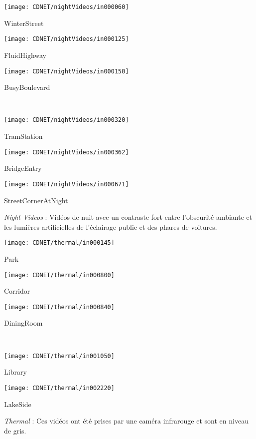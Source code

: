 	\begin{figureth}
		\begin{subfigureth}{0.24\textwidth}
			\texttt{[image: CDNET/nightVideos/in000060]}\caption{WinterStreet}	
		\end{subfigureth}
		\begin{subfigureth}{0.24\textwidth}
			\texttt{[image: CDNET/nightVideos/in000125]}\caption{FluidHighway}	
		\end{subfigureth}
		\begin{subfigureth}{0.24\textwidth}
			\texttt{[image: CDNET/nightVideos/in000150]}\caption{BusyBoulevard}	
		\end{subfigureth}\\
		\begin{subfigureth}{0.24\textwidth}
			\texttt{[image: CDNET/nightVideos/in000320]}\caption{TramStation}	
		\end{subfigureth}
		\begin{subfigureth}{0.24\textwidth}
			\texttt{[image: CDNET/nightVideos/in000362]}\caption{BridgeEntry}	
		\end{subfigureth}
		\begin{subfigureth}{0.24\textwidth}
			\texttt{[image: CDNET/nightVideos/in000671]}\caption{StreetCornerAtNight}	
		\end{subfigureth}
		\caption[Categorie Night Videos]{\textit{Night Videos} : Vidéos de nuit avec un contraste fort entre l'obscurité ambiante et les lumières artificielles de l'éclairage public et des phares de voitures.}\label{fig:cdnet:night}
	\end{figureth}

	\begin{figureth}
		\begin{subfigureth}{0.24\textwidth}
			\texttt{[image: CDNET/thermal/in000145]}\caption{Park}
		\end{subfigureth}
		\begin{subfigureth}{0.24\textwidth}
			\texttt{[image: CDNET/thermal/in000800]}\caption{Corridor}	
		\end{subfigureth}
		\begin{subfigureth}{0.24\textwidth}
			\texttt{[image: CDNET/thermal/in000840]}\caption{DiningRoom}	
		\end{subfigureth}\\
		\begin{subfigureth}{0.24\textwidth}
			\texttt{[image: CDNET/thermal/in001050]}\caption{Library}	
		\end{subfigureth}
		\begin{subfigureth}{0.24\textwidth}
			\texttt{[image: CDNET/thermal/in002220]}\caption{LakeSide}	
		\end{subfigureth}
		\caption[Categorie thermal]{\textit{Thermal} : Ces vidéos ont été prises par une caméra infrarouge et sont en niveau de gris.}\label{fig:cdnet:shadow}
	\end{figureth}


